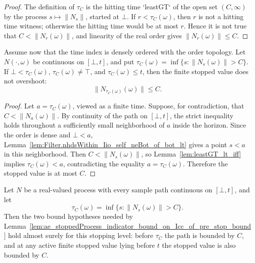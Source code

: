 \begin{proof}
The definition of \(\tau_C\) is the hitting time `leastGT` of the open set
\((C,\infty)\) by the process \(s\mapsto\|N_s\|\), started at \(\bot\).
If \(r<\tau_C(\omega)\), then \(r\) is not a hitting time witness; otherwise
the hitting time would be at most \(r\).  Hence it is not true that
\(C<\|N_r(\omega)\|\), and linearity of the real order gives
\(\|N_r(\omega)\|\le C\).
\end{proof}

\begin{lemma}\label{lem:leastGT_norm_stop_value_bound_on_Icc_of_continuousOn}
Assume now that the time index is densely ordered with the order topology.
Let \(N(\cdot,\omega)\) be continuous on \([\bot,t]\), and put
\(\tau_C(\omega)=\inf\{s:\|N_s(\omega)\|>C\}\).  If
\(\bot<\tau_C(\omega)\), \(\tau_C(\omega)\ne\top\), and
\(\tau_C(\omega)\le t\), then the finite stopped value does not overshoot:
\[
  \|N_{\tau_C(\omega)}(\omega)\|\le C .
\]
\end{lemma}

\begin{proof}
Let \(a=\tau_C(\omega)\), viewed as a finite time.  Suppose, for contradiction,
that \(C<\|N_a(\omega)\|\).  By continuity of the path on \([\bot,t]\), the
strict inequality holds throughout a sufficiently small neighborhood of \(a\)
inside the horizon.  Since the order is dense and \(\bot<a\),
Lemma~\ref{lem:Filter.nhdsWithin_Iio_self_neBot_of_bot_lt} gives a point
\(s<a\) in this neighborhood.  Then \(C<\|N_s(\omega)\|\), so
Lemma~\ref{lem:leastGT_lt_iff} implies \(\tau_C(\omega)<a\), contradicting
the equality \(a=\tau_C(\omega)\).  Therefore the stopped value is at most
\(C\).
\end{proof}

\begin{lemma}\label{lem:ae_leastGT_norm_pre_stop_stop_value_bound_on_Icc_of_continuousOn}
Let \(N\) be a real-valued process with every sample path continuous on
\([\bot,t]\), and let
\[
  \tau_C(\omega)=\inf\{s:\|N_s(\omega)\|>C\}.
\]
Then the two bound hypotheses needed by
Lemma~\ref{lem:ae_stoppedProcess_indicator_bound_on_Icc_of_pre_stop_bound}
hold almost surely for this stopping level: before \(\tau_C\) the path is
bounded by \(C\), and at any active finite stopped value lying before \(t\)
the stopped value is also bounded by \(C\).
\end{lemma}

